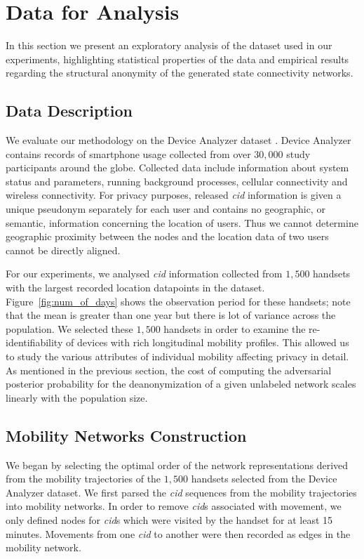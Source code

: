 \section{Data for Analysis}

In this section we present an exploratory analysis of the dataset used in our experiments, highlighting statistical properties of the data and empirical results regarding the structural anonymity of the generated state connectivity networks.

\subsection{Data Description}

We evaluate our methodology on the Device Analyzer dataset \cite{Wagner2014}. Device Analyzer contains records of smartphone usage collected from over $ 30,000 $  study participants around the globe.
Collected data include information about system status and parameters, running background processes, cellular connectivity and wireless connectivity.
For privacy purposes, released \emph{cid} information is given a unique pseudonym separately for each user and contains no geographic, or semantic, information concerning the location of users.
Thus we cannot determine geographic proximity between the nodes and the location data of two users cannot be directly aligned.

For our experiments, we analysed \emph{cid} information collected from $1,500$ handsets with the largest recorded location datapoints in the dataset.
Figure~\ref{fig:num_of_days} shows the observation period for these handsets; note that the mean is greater than one year but there is lot of variance across the population.
We selected these $1,500$ handsets in order to examine the re-identifiability of devices with rich longitudinal mobility profiles.
This allowed us to study the various attributes of individual mobility affecting privacy in detail.
As mentioned in the previous section, the cost of computing the adversarial posterior probability for the deanonymization of a given unlabeled network scales linearly with the population size.


\subsection{Mobility Networks Construction\label{sec:mobility-net-construct}}

We began by selecting the optimal order of the network representations derived from the mobility trajectories of the $1,500$ handsets selected from the Device Analyzer dataset.
We first parsed the \emph{cid} sequences from the mobility trajectories into mobility networks.
In order to remove \emph{cid}s associated with movement, we only defined nodes for \emph{cid}s which were visited by the handset for at least 15 minutes.
Movements from one \emph{cid} to another were then recorded as edges in the mobility network.

